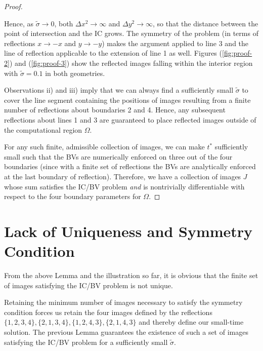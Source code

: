 \begin{proof}
\begin{enumerate}
    Hence, as $\tilde{\sigma} \to 0$, both $\Delta x^2 \to \infty$ and
    $\Delta y^2 \to \infty$, so that the distance between the point of
    intersection and the IC grows. The symmetry of the problem (in
    terms of reflections $x \to -x$ and $y \to -y$) makes the argument
    applied to line 3 and the line of reflection applicable to the
    extension of line 1 as well. Figures (\ref{fig:proof-2}) and
    (\ref{fig:proof-3}) show the reflected images falling within the
    interior region with $\tilde{\sigma} = 0.1$ in both geometries.
  \end{enumerate}
  Observations ii) and iii) imply that we can always find a
  sufficiently small $\tilde{\sigma}$ to cover the line segment
  containing the positions of images resulting from a finite number of
  reflections about boundaries 2 and 4.  Hence, any subsequent
  reflections about lines 1 and 3 are guaranteed to place reflected
  images outside of the computational region $\Omega$.

  For any such finite, admissible collection of images, we can make
  $t^*$ sufficiently small such that the BVs are numerically
  enforced on three out of the four boundaries (since with a finite
  set of reflections the BVs are analytically enforced at the last
  boundary of reflection). Therefore, we have a collection of images
  $J$ whose sum satisfies the IC/BV problem \textit{and} is
  nontrivially differentiable with respect to the four boundary
  parameters for $\Omega$.
\end{proof}

\section{Lack of Uniqueness and Symmetry Condition}
From the above Lemma and the illustration so far, it is obvious that
the finite set of images satisfying the IC/BV problem is not unique. 


Retaining the minimum number of images necessary to satisfy the
symmetry condition forces us retain the four images defined by the
reflections $\{1,2,3,4 \},\{2,1,3,4 \},\{1,2,4,3 \},\{2,1,4,3 \}$ and
thereby define our small-time solution. The previous Lemma guarantees
the existence of such a set of images satisfying the IC/BV problem for
a sufficiently small $\tilde{\sigma}.$ 


